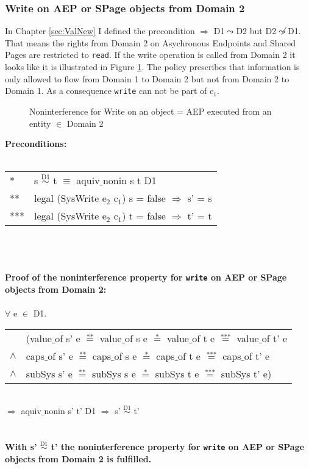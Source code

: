 \subsubsection{Write on AEP or SPage objects from Domain 2}\label{WriteOut}
In Chapter \ref{sec:ValNew} I defined the precondition $\Rightarrow$ D1$\leadsto$D2 but D2$\not\leadsto$D1. That means the rights from Domain 2 on Asychronous Endpoints and Shared Pages are restricted to \texttt{read}. 
If the write operation is called from Domain 2 it looks like it is illustrated in Figure \ref{fig:WriteOut1}. The policy prescribes that information is only allowed to flow from Domain 1 to Domain 2 but not from Domain 2 to Domain 1. As a consequence \texttt{write} can not be part of c$_1$. 
\begin{flushleft}
\begin{figure}[H]
\caption{Noninterference for Write on an object = AEP executed from an entity $\in$ Domain 2}
\label{fig:WriteOut1}
\end{figure}
\end{flushleft}
\textbf{Preconditions:} \\ \\
\begin{tabular}{ll}
* & s $\overset{\text{D1}}{\sim}$ t $\equiv$ aquiv$\_$nonin s t D1	\\ 
** & legal (SysWrite e$_2$ c$_1$) s = false $\Rightarrow$ s' = s \\ 
*** & legal (SysWrite e$_2$ c$_1$) t = false $\Rightarrow$ t' = t
\end{tabular} \\ \\ \\
\textbf{Proof of the noninterference property for \texttt{write} on AEP or SPage objects from Domain 2:}\\ \\
$\forall$ e $\in$ D1. \\ 
\begin{tabular}{ll}
& (value$\_$of s' e $\overset{\text{**}}{=}$ value$\_$of s e $\overset{\text{*}}{=}$ value$\_$of t e $\overset{\text{***}}{=}$ value$\_$of t' e \\
$\wedge$ & caps$\_$of s' e $\overset{\text{**}}{=}$ caps$\_$of s e $\overset{\text{*}}{=}$ caps$\_$of t e $\overset{\text{***}}{=}$ caps$\_$of t' e \\
$\wedge$ & subSys s' e $\overset{\text{**}}{=}$ subSys s e $\overset{\text{*}}{=}$ subSys t e $\overset{\text{***}}{=}$ subSys t' e)
\end{tabular} \\
$\Rightarrow$ aquiv$\_$nonin s' t' D1 $\Rightarrow$ s' $\overset{\text{D1}}{\sim}$ t' \\ \\ \\
\textbf{With s' $\overset{\text{D1}}{\sim}$ t' the noninterference property for \texttt{write} on AEP or SPage objects from Domain 2 is fulfilled.}  
\clearpage
